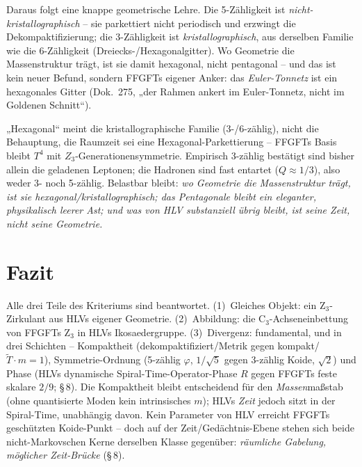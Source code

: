 Daraus folgt eine knappe geometrische Lehre. Die 5-Zähligkeit ist
\emph{nicht-kristallographisch} -- sie parkettiert nicht periodisch und erzwingt die
Dekompaktifizierung; die 3-Zähligkeit ist \emph{kristallographisch}, aus derselben
Familie wie die 6-Zähligkeit (Dreiecks-/Hexagonalgitter). Wo Geometrie die
Massenstruktur trägt, ist sie damit hexagonal, nicht pentagonal -- und das ist kein
neuer Befund, sondern FFGFTs eigener Anker: das \emph{Euler-Tonnetz} ist ein
hexagonales Gitter (Dok.~275, „der Rahmen ankert im Euler-Tonnetz, nicht im Goldenen
Schnitt``).

\begin{important}
„Hexagonal`` meint die kristallographische Familie (3-/6-zählig), nicht die
Behauptung, die Raumzeit sei eine Hexagonal-Parkettierung -- FFGFTs Basis bleibt
$T^4$ mit $Z_3$-Generationensymmetrie. Empirisch 3-zählig bestätigt sind bisher
allein die geladenen Leptonen; die Hadronen sind fast entartet ($Q\approx1/3$), also
weder 3- noch 5-zählig. Belastbar bleibt: \emph{wo Geometrie die Massenstruktur
trägt, ist sie hexagonal/kristallographisch; das Pentagonale bleibt ein eleganter,
physikalisch leerer Ast; und was von HLV substanziell übrig bleibt, ist seine Zeit,
nicht seine Geometrie.}
\end{important}

\section{Fazit}

Alle drei Teile des Kriteriums sind beantwortet. (1)~Gleiches Objekt: ein
Z$_3$-Zirkulant aus HLVs eigener Geometrie. (2)~Abbildung: die C$_3$-Achseneinbettung
von FFGFTs Z$_3$ in HLVs Ikosaedergruppe. (3)~Divergenz: fundamental, und in drei
Schichten -- Kompaktheit (dekompaktifiziert/Metrik gegen kompakt/$\tilde T\!\cdot\! m=1$),
Symmetrie-Ordnung (5-zählig $\varphi$, $1/\sqrt5$ gegen 3-zählig Koide, $\sqrt2$)
und Phase (HLVs dynamische Spiral-Time-Operator-Phase $R$ gegen FFGFTs feste
skalare $2/9$; §\,8). Die Kompaktheit bleibt entscheidend für den \emph{Massen}maßstab
(ohne quantisierte Moden kein intrinsisches $m$); HLVs \emph{Zeit} jedoch sitzt in
der Spiral-Time, unabhängig davon. Kein Parameter von HLV erreicht FFGFTs geschützten
Koide-Punkt -- doch auf der Zeit/Gedächtnis-Ebene stehen sich beide nicht-Markovschen
Kerne derselben Klasse gegenüber: \emph{räumliche Gabelung, möglicher Zeit-Brücke} (§\,8).

